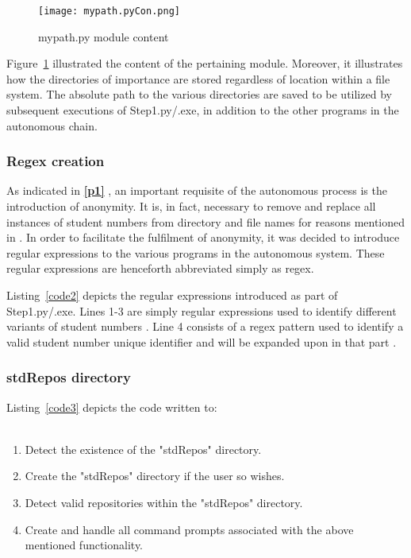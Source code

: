 \begin{figure}[H]
\begin{center}
\texttt{[image: mypath.pyCon.png]}
\caption{mypath.py module content}
\label{mypath.pyCon}
\end{center}
\end{figure}

Figure~\ref{mypath.pyCon} illustrated the content of the pertaining module. Moreover, it illustrates how the directories of importance are stored regardless of location within a file system. The absolute path to the various directories are saved to be utilized by subsequent executions of Step1.py/.exe, in addition to the other programs in the autonomous chain.


\subsubsection{Regex creation}
\label{regex1}
As indicated in \textbf{\ref{p1} }, an important requisite of the autonomous process is the introduction of anonymity. It is, in fact, necessary to remove and replace all instances of student numbers from directory and file names for reasons mentioned in \textbf{}. In order to facilitate the fulfilment of anonymity, it was decided to introduce regular expressions to the various programs in the autonomous system. These regular expressions are henceforth abbreviated simply as regex. 



Listing~\ref{code2} depicts the regular expressions introduced as part of Step1.py/.exe. Lines 1-3 are simply regular expressions used to identify different variants of student numbers \cite{Sweigart2015}\cite{regex}. Line 4 consists of a regex pattern used to identify a valid student number unique identifier and will be expanded upon in \color{green}that part \color{black}.
\subsubsection{stdRepos directory}
\label{stdRepos}


Listing~\ref{code3} depicts the code written to:
\\\\
\begin{enumerate}
\item Detect the existence of the "stdRepos" directory.
\item Create the "stdRepos" directory if the user so wishes.
\item Detect valid repositories within the "stdRepos" directory.
\item Create and handle all command prompts associated with the above mentioned functionality.
\end{enumerate}

